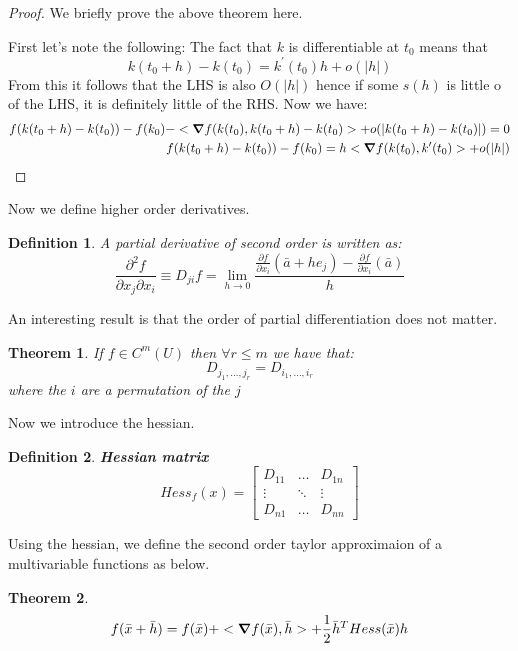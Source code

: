 \documentclass[titlepage]{article}
\newtheorem{theorem}{Theorem}[section]
\newtheorem{definition}{Definition}
\begin{document}
\begin{proof}
We briefly prove the above theorem here.

First let's note the following:
The fact that $k$ is differentiable at $t_{0}$ means that 
$$k(t_{0}+h) - k(t_{0}) = k^{\prime}(t_{0})h + o(|h|) $$ From this it follows that the LHS is also $O(|h|)$ hence if some $s(h)$ is little o of the LHS, it is definitely little of the RHS. Now we have:
\begin{align*}
    f(k(t_{0}+h) - k(t_{0})) - f(k_{0}) - <\grad f(k(t_{0}),k(t_{0}+h) - k(t_{0})> + o(|k(t_{0}+h) - k(t_{0})|) = 0\\
     f(k(t_{0}+h) - k(t_{0})) - f(k_{0}) = h<\grad f(k(t_{0}),k^{\prime}(t_{0})> + o(|h|)
\end{align*}
\end{proof}

Now we define higher order derivatives. 
\begin{definition}
A partial derivative of second order is written as:
$$\frac{\partial^{2}f}{\partial x_{j} \partial x_{i}} \equiv D_{ji}f = \lim_{h\to 0}\frac{\frac{\partial f}{\partial x_{i}}(\bar{a} + he_{j}) - \frac{\partial f}{\partial x_{i}}(\bar{a})}{h} $$
\end{definition}

An interesting result is that the order of partial differentiation does not matter.
\begin{theorem}
If $f \in C^{m}(U)$ then $\forall r \leq m$ we have that:
$$D_{j_{1},\ldots, j_{r}} = D_{i_{1},\ldots, i_{r}} $$ where the $i$ are a permutation of the $j$
\end{theorem}

Now we introduce the hessian. 

\begin{definition}\textbf{Hessian matrix}
$$ Hess_{f}(x) = 
\begin{bmatrix}
 D_{11} & \ldots & D_{1n}\\
 \vdots & \ddots & \vdots\\
 D_{n1} & \ldots & D_{nn}
\end{bmatrix}
$$
\end{definition}

Using the hessian, we define the second order taylor approximaion of a multivariable functions as below.

\begin{theorem}
$$f(\bar{x}+\bar{h}) = f(\bar{x}) + <\grad f(\bar{x}),\bar{h}> + \frac{1}{2} \bar{h}^{T} Hess(\bar{x})h$$
\end{theorem}
\end{document}

